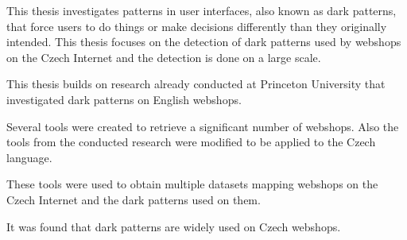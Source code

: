 This thesis investigates patterns in user interfaces, also known as dark patterns, that force users to do things or make decisions differently than they originally intended. This thesis focuses on the detection of dark patterns used by webshops on the Czech Internet and the detection is done on a large scale.

This thesis builds on research already conducted at Princeton University that investigated dark patterns on English webshops.

Several tools were created to retrieve a significant number of webshops. Also the tools from the conducted research were modified to be applied to the Czech language.

These tools were used to obtain multiple datasets mapping webshops on the Czech Internet and the dark patterns used on them.

It was found that dark patterns are widely used on Czech webshops.